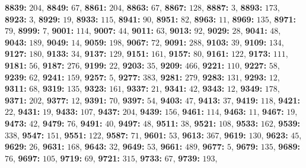 \textsf{\bfseries 8839:} $204$, \textsf{\bfseries 8849:} $67$, \textsf{\bfseries 8861:} $204$, \textsf{\bfseries 8863:} $67$, \textsf{\bfseries 8867:} $128$, \textsf{\bfseries 8887:} $3$, \textsf{\bfseries 8893:} $173$, \textsf{\bfseries 8923:} $3$, \textsf{\bfseries 8929:} $19$, \textsf{\bfseries 8933:} $115$, \textsf{\bfseries 8941:} $90$, \textsf{\bfseries 8951:} $82$, \textsf{\bfseries 8963:} $11$, \textsf{\bfseries 8969:} $135$, \textsf{\bfseries 8971:} $79$, \textsf{\bfseries 8999:} $7$, \textsf{\bfseries 9001:} $114$, \textsf{\bfseries 9007:} $44$, \textsf{\bfseries 9011:} $63$, \textsf{\bfseries 9013:} $92$, \textsf{\bfseries 9029:} $28$, \textsf{\bfseries 9041:} $48$, \textsf{\bfseries 9043:} $189$, \textsf{\bfseries 9049:} $14$, \textsf{\bfseries 9059:} $198$, \textsf{\bfseries 9067:} $72$, \textsf{\bfseries 9091:} $288$, \textsf{\bfseries 9103:} $39$, \textsf{\bfseries 9109:} $134$, \textsf{\bfseries 9127:} $180$, \textsf{\bfseries 9133:} $34$, \textsf{\bfseries 9137:} $129$, \textsf{\bfseries 9151:} $161$, \textsf{\bfseries 9157:} $80$, \textsf{\bfseries 9161:} $122$, \textsf{\bfseries 9173:} $111$, \textsf{\bfseries 9181:} $56$, \textsf{\bfseries 9187:} $276$, \textsf{\bfseries 9199:} $22$, \textsf{\bfseries 9203:} $35$, \textsf{\bfseries 9209:} $466$, \textsf{\bfseries 9221:} $110$, \textsf{\bfseries 9227:} $58$, \textsf{\bfseries 9239:} $62$, \textsf{\bfseries 9241:} $159$, \textsf{\bfseries 9257:} $5$, \textsf{\bfseries 9277:} $383$, \textsf{\bfseries 9281:} $279$, \textsf{\bfseries 9283:} $131$, \textsf{\bfseries 9293:} $12$, \textsf{\bfseries 9311:} $68$, \textsf{\bfseries 9319:} $135$, \textsf{\bfseries 9323:} $161$, \textsf{\bfseries 9337:} $21$, \textsf{\bfseries 9341:} $42$, \textsf{\bfseries 9343:} $12$, \textsf{\bfseries 9349:} $178$, \textsf{\bfseries 9371:} $202$, \textsf{\bfseries 9377:} $12$, \textsf{\bfseries 9391:} $70$, \textsf{\bfseries 9397:} $54$, \textsf{\bfseries 9403:} $47$, \textsf{\bfseries 9413:} $37$, \textsf{\bfseries 9419:} $118$, \textsf{\bfseries 9421:} $22$, \textsf{\bfseries 9431:} $19$, \textsf{\bfseries 9433:} $107$, \textsf{\bfseries 9437:} $204$, \textsf{\bfseries 9439:} $156$, \textsf{\bfseries 9461:} $114$, \textsf{\bfseries 9463:} $11$, \textsf{\bfseries 9467:} $19$, \textsf{\bfseries 9473:} $42$, \textsf{\bfseries 9479:} $76$, \textsf{\bfseries 9491:} $40$, \textsf{\bfseries 9497:} $48$, \textsf{\bfseries 9511:} $38$, \textsf{\bfseries 9521:} $108$, \textsf{\bfseries 9533:} $162$, \textsf{\bfseries 9539:} $338$, \textsf{\bfseries 9547:} $151$, \textsf{\bfseries 9551:} $122$, \textsf{\bfseries 9587:} $71$, \textsf{\bfseries 9601:} $53$, \textsf{\bfseries 9613:} $367$, \textsf{\bfseries 9619:} $130$, \textsf{\bfseries 9623:} $45$, \textsf{\bfseries 9629:} $26$, \textsf{\bfseries 9631:} $168$, \textsf{\bfseries 9643:} $32$, \textsf{\bfseries 9649:} $53$, \textsf{\bfseries 9661:} $489$, \textsf{\bfseries 9677:} $5$, \textsf{\bfseries 9679:} $135$, \textsf{\bfseries 9689:} $76$, \textsf{\bfseries 9697:} $105$, \textsf{\bfseries 9719:} $69$, \textsf{\bfseries 9721:} $315$, \textsf{\bfseries 9733:} $67$, \textsf{\bfseries 9739:} $193$, 
